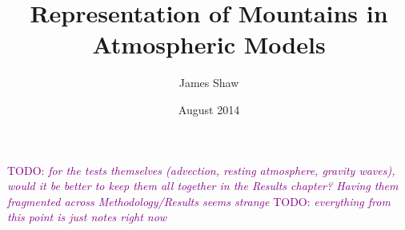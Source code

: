 \documentclass[a4paper,twoside\classopts]{memoir}
\title{Representation of Mountains in Atmospheric Models}
\author{James Shaw}
\date{August 2014}
\begin{document}
\newcommand{\TODO}[1]{\textcolor{purple}{TODO: \emph{#1}}}
\newcommand{\TODOsidenote}[1]{\marginpar{\footnotesize{\TODO{#1}}\vspace{0.3em}}}




\frontmatter
\thispagestyle{plain}
\null\vfil
\begin{abstract}
\blindtext
\end{abstract}
\vfil

\cleardoublepage
\tableofcontents*

\mainmatter


\TODO{for the tests themselves (advection, resting atmosphere, gravity waves), would it be better to keep them all together in the Results chapter?  Having them fragmented across Methodology/Results seems strange}
\TODO{everything from this point is just notes right now}



\backmatter
\printbibliography
\end{document}
